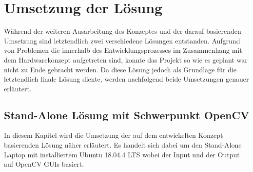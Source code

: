 \documentclass[12pt, a4paper]{scrbook}
\begin{document}
\chapter{Umsetzung der Lösung}
Während der weiteren Ausarbeitung des Konzeptes und der darauf basierenden Umsetzung sind letztendlich zwei verschiedene Lösungen entstanden. Aufgrund von Problemen die innerhalb des Entwicklungsprozesses im Zusammenhang mit dem Hardwarekonzept aufgetreten sind, konnte das Projekt so wie es geplant war nicht zu Ende gebracht werden. Da diese Lösung jedoch als Grundlage für die letztendlich finale Lösung diente, werden nachfolgend beide Umsetzungen genauer erläutert.

\section{Stand-Alone Lösung mit Schwerpunkt OpenCV}
In diesem Kapitel wird die Umsetzung der auf dem entwickelten Konzept basierenden Lösung näher erläutert. Es handelt sich dabei um den Stand-Alone Laptop mit installiertem Ubuntu 18.04.4 LTS wobei der Input und der Output auf OpenCV GUIs basiert.
\end{document}
